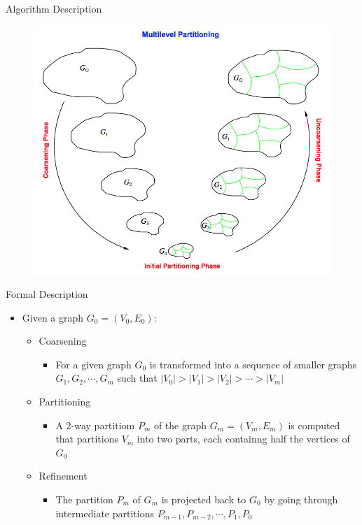 \documentclass{beamer}
\begin{document}
\begin{frame}{Algorithm Description}
  \begin{center}
  \begin{figure}[htbp]
      \includegraphics[scale=.5]{img/metis.png}
  \end{figure}
  \end{center}
\end{frame}

\begin{frame}{Formal Description}

\begin{itemize}
  \item Given a graph $G_0 = (V_0,E_0)$:
  \begin{itemize}    
    \item Coarsening
    \begin{itemize}
      \item For a given graph $G_0$ is transformed into a sequence of smaller graphs $G_1,G_2,\cdots,G_m$ such that $|V_0|>|V_1|>|V_2|>\cdots>|V_m|$
    \end{itemize}
    \item Partitioning 
    \begin{itemize}
      \item A 2-way partitiom $P_m$ of the graph $G_m = (V_m,E_m)$ is computed that partitions $V_m$ into two parts, each containng half the vertices of $G_0$
    \end{itemize}
    \item Refinement
    \begin{itemize}
      \item The partition $P_m$ of $G_m$ is projected back to $G_0$ by going through intermediate partitions $P_{m-1}, P_{m-2},\cdots,P_1,P_0 $
    \end{itemize}
  \end{itemize}
\end{itemize}
  
\end{frame}
\end{document}
